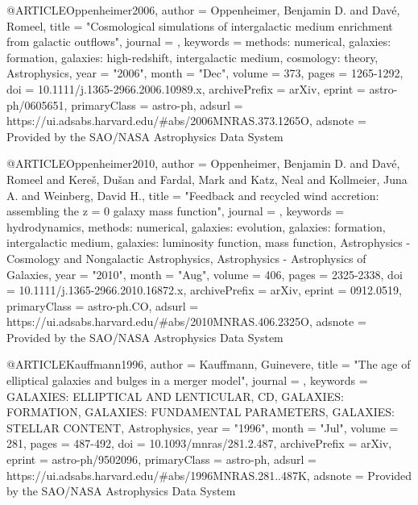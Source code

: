 {@ARTICLE{Oppenheimer2006,
       author = {{Oppenheimer}, Benjamin D. and {Dav{\'e}}, Romeel},
        title = "{Cosmological simulations of intergalactic medium enrichment from galactic outflows}",
      journal = {\mnras},
     keywords = {methods: numerical, galaxies: formation, galaxies: high-redshift, intergalactic medium, cosmology: theory, Astrophysics},
         year = "2006",
        month = "Dec",
       volume = {373},
        pages = {1265-1292},
          doi = {10.1111/j.1365-2966.2006.10989.x},
archivePrefix = {arXiv},
       eprint = {astro-ph/0605651},
 primaryClass = {astro-ph},
       adsurl = {https://ui.adsabs.harvard.edu/\#abs/2006MNRAS.373.1265O},
      adsnote = {Provided by the SAO/NASA Astrophysics Data System}
}

@ARTICLE{Oppenheimer2010,
       author = {{Oppenheimer}, Benjamin D. and {Dav{\'e}}, Romeel and
         {Kere{\v{s}}}, Du{\v{s}}an and {Fardal}, Mark and {Katz}, Neal and
         {Kollmeier}, Juna A. and {Weinberg}, David H.},
        title = "{Feedback and recycled wind accretion: assembling the z = 0 galaxy mass function}",
      journal = {\mnras},
     keywords = {hydrodynamics, methods: numerical, galaxies: evolution, galaxies: formation, intergalactic medium, galaxies: luminosity function, mass function, Astrophysics - Cosmology and Nongalactic Astrophysics, Astrophysics - Astrophysics of Galaxies},
         year = "2010",
        month = "Aug",
       volume = {406},
        pages = {2325-2338},
          doi = {10.1111/j.1365-2966.2010.16872.x},
archivePrefix = {arXiv},
       eprint = {0912.0519},
 primaryClass = {astro-ph.CO},
       adsurl = {https://ui.adsabs.harvard.edu/\#abs/2010MNRAS.406.2325O},
      adsnote = {Provided by the SAO/NASA Astrophysics Data System}
}

@ARTICLE{Kauffmann1996,
       author = {{Kauffmann}, Guinevere},
        title = "{The age of elliptical galaxies and bulges in a merger model}",
      journal = {\mnras},
     keywords = {GALAXIES: ELLIPTICAL AND LENTICULAR, CD, GALAXIES: FORMATION, GALAXIES: FUNDAMENTAL PARAMETERS, GALAXIES: STELLAR CONTENT, Astrophysics},
         year = "1996",
        month = "Jul",
       volume = {281},
        pages = {487-492},
          doi = {10.1093/mnras/281.2.487},
archivePrefix = {arXiv},
       eprint = {astro-ph/9502096},
 primaryClass = {astro-ph},
       adsurl = {https://ui.adsabs.harvard.edu/\#abs/1996MNRAS.281..487K},
      adsnote = {Provided by the SAO/NASA Astrophysics Data System}
}

}
